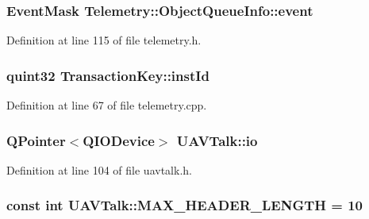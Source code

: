 \hypertarget{group___u_a_v_talk_plugin_ga6cc8fb5745c2e3cc2a6e0e4512542d7c}{
\subsubsection[{event}]{\setlength{\rightskip}{0pt plus 5cm}\-Event\-Mask \-Telemetry\-::\-Object\-Queue\-Info\-::event}}\label{group___u_a_v_talk_plugin_ga6cc8fb5745c2e3cc2a6e0e4512542d7c}


\-Definition at line 115 of file telemetry.\-h.

\hypertarget{group___u_a_v_talk_plugin_ga3d92643b78ea3e10cd9ac1ac2cc4b5f7}{
\subsubsection[{inst\-Id}]{\setlength{\rightskip}{0pt plus 5cm}quint32 {\bf \-Transaction\-Key\-::inst\-Id}}}\label{group___u_a_v_talk_plugin_ga3d92643b78ea3e10cd9ac1ac2cc4b5f7}


\-Definition at line 67 of file telemetry.\-cpp.

\hypertarget{group___u_a_v_talk_plugin_ga0047f38af98ba4de8e38500e10b73046}{
\subsubsection[{io}]{\setlength{\rightskip}{0pt plus 5cm}\-Q\-Pointer$<$\-Q\-I\-O\-Device$>$ {\bf \-U\-A\-V\-Talk\-::io}}}\label{group___u_a_v_talk_plugin_ga0047f38af98ba4de8e38500e10b73046}


\-Definition at line 104 of file uavtalk.\-h.

\hypertarget{group___u_a_v_talk_plugin_ga279763a8abdcb2fae7cb36916b36c1a8}{
\subsubsection[{\-M\-A\-X\-\_\-\-H\-E\-A\-D\-E\-R\-\_\-\-L\-E\-N\-G\-T\-H}]{\setlength{\rightskip}{0pt plus 5cm}const int {\bf \-U\-A\-V\-Talk\-::\-M\-A\-X\-\_\-\-H\-E\-A\-D\-E\-R\-\_\-\-L\-E\-N\-G\-T\-H} = 10}}\label{group___u_a_v_talk_plugin_ga279763a8abdcb2fae7cb36916b36c1a8}


